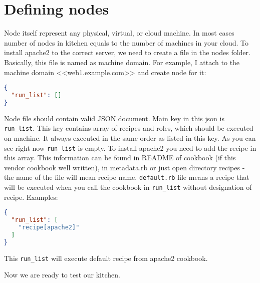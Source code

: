\section{Defining nodes}
\label{sec:solo-node}

Node itself represent any physical, virtual, or cloud machine. In most cases number of nodes in kitchen equals to the number of machines in your cloud. To install apache2 to the correct server, we need to create a file in the nodes folder. Basically, this file is named as machine domain. For example, I attach to the machine domain <<web1.example.com>> and create node for it:

\begin{lstlisting}[language=JSON,label=lst:my-cloud-node1,title=my-cloud/nodes/web1.example.com.json]
{
  "run_list": []
}
\end{lstlisting}

Node file should contain valid JSON document. Main key in this json is \lstinline!run_list!. This key contains array of recipes and roles, which should be executed on machine. It always executed in the same order as listed in this key. As you can see right now \lstinline!run_list! is empty. To install apache2 you need to add the recipe in this array. This information can be found in README of cookbook (if this vendor cookbook well written), in metadata.rb or just open directory recipes - the name of the file will mean recipe name. \lstinline!default.rb! file means a recipe that will be executed when you call the cookbook in \lstinline!run_list! without designation of recipe. Examples:

\begin{lstlisting}[language=JSON,label=lst:my-cloud-node2,title=my-cloud/nodes/web1.example.com.json]
{
  "run_list": [
    "recipe[apache2]"
  ]
}
\end{lstlisting}

This \lstinline!run_list! will execute default recipe from apache2 cookbook.

Now we are ready to test our kitchen.

